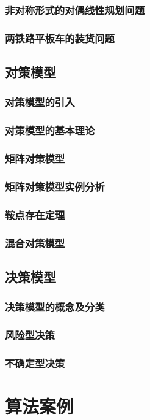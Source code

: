\documentclass[openany]{progbookcn}
\begin{document}
\section{非对称形式的对偶线性规划问题}
\section{两铁路平板车的装货问题}

\chapter{对策模型}
\section{对策模型的引入}
\section{对策模型的基本理论}
\section{矩阵对策模型}
\section{矩阵对策模型实例分析}
\section{鞍点存在定理}
\section{混合对策模型}

\chapter{决策模型}
\section{决策模型的概念及分类}
\section{风险型决策}
\section{不确定型决策}

\part{算法案例}
\end{document}
